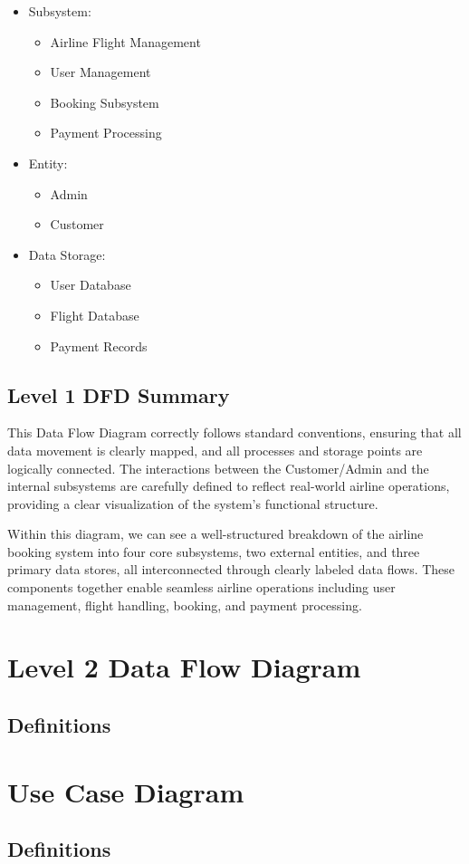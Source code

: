 \documentclass{article}
\begin{document}
\begin{itemize}
\item Subsystem:
    \begin{itemize}
    \item Airline Flight Management
    \item User Management
    \item Booking Subsystem
    \item Payment Processing
    \end{itemize}
\item Entity:
    \begin{itemize}
    \item Admin
    \item Customer
    \end{itemize}
\item Data Storage:
    \begin{itemize}
    \item User Database
    \item Flight Database
    \item Payment Records
    \end{itemize}
\end{itemize}

\subsection{Level 1 DFD Summary}

This Data Flow Diagram correctly follows standard conventions, ensuring that all data movement is clearly mapped, and all processes and storage points are logically connected. The interactions between the Customer/Admin and the internal subsystems are carefully defined to reflect real-world airline operations, providing a clear visualization of the system's functional structure.

Within this diagram, we can see a well-structured breakdown of the airline booking system into four core subsystems, two external entities, and three primary data stores, all interconnected through clearly labeled data flows. These components together enable seamless airline operations including user management, flight handling, booking, and payment processing.

\section{Level 2 Data Flow Diagram}

\subsection{Definitions}

\section{Use Case Diagram}

\subsection{Definitions}



\end{document}
